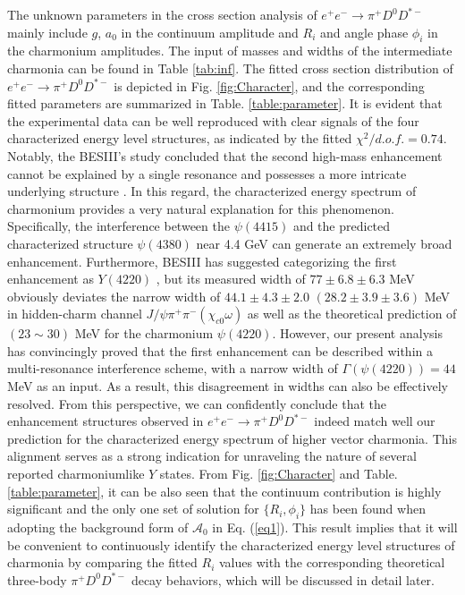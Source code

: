 \documentclass[prl,twocolumn,floatfix,amsmath,nofootinbib,amssymb,floatfix]{revtex4}
\begin{document}
The unknown parameters in the cross section analysis of $e^+e^- \to\pi^+ D^0 D^{*-}$ mainly include $g$, $a_0$ in the continuum amplitude and $R_i$ and angle phase $\phi_i$ in the charmonium amplitudes. The input of masses and widths of the intermediate charmonia can be found in Table \ref{tab:inf}. The fitted cross section distribution of $e^+e^- \to\pi^+ D^0 D^{*-}$ is depicted in Fig. \ref{fig:Character}, and the corresponding fitted parameters are summarized in Table. \ref{table:parameter}. It is evident that the experimental data can be well reproduced with clear signals of the four characterized energy level structures, as indicated by the fitted $\chi^2/d.o.f.=0.74$. Notably, the BESIII's study concluded that the second high-mass enhancement cannot be explained by a single resonance and possesses a more intricate underlying structure \cite{BESIII:2018iea}. In this regard, the characterized energy spectrum of charmonium provides a very natural explanation for this phenomenon. Specifically, the interference between the $\psi(4415)$ and the predicted characterized structure $\psi(4380)$ near 4.4 GeV can generate an extremely broad enhancement. Furthermore, BESIII has suggested categorizing the first enhancement as $Y(4220)$ \cite{BESIII:2018iea}, but its measured width of $77\pm6.8\pm6.3$ MeV \cite{BESIII:2018iea} obviously deviates the narrow width of $44.1\pm4.3\pm2.0$ $(28.2\pm3.9\pm3.6)$ MeV in hidden-charm channel $J/\psi\pi^+\pi^-(\chi_{c0}\omega)$ \cite{BESIII:2016bnd,BESIII:2019gjc} as well as the theoretical prediction of $(23\sim30)$ MeV \cite{Wang:2019mhs} for the charmonium $\psi(4220)$. However, our present analysis has convincingly proved that the first enhancement can be described within a multi-resonance interference scheme, with a narrow width of $\Gamma(\psi(4220))=44$ MeV as an input. As a result, this disagreement in widths can also be  effectively resolved.
From this perspective, we can confidently conclude that the enhancement structures observed in $e^+e^- \to\pi^+ D^0 D^{*-}$ indeed match well our prediction for the characterized energy spectrum of higher vector charmonia. This alignment serves as a strong indication for unraveling the nature of several reported charmoniumlike $Y$ states.   From Fig. \ref{fig:Character} and Table. \ref{table:parameter}, it can be also seen that the continuum contribution is highly significant and the only one set of solution for $\{R_i,\phi_i\}$ has been found when adopting the background form of $\mathcal{A}_0$ in Eq. (\ref{eq1}). This result implies that it will be convenient to continuously identify the characterized energy level structures of charmonia by comparing the fitted $R_i$ values with the corresponding theoretical three-body $\pi^+ D^0 D^{*-}$ decay behaviors, which will be discussed in detail later.  
\end{document}
